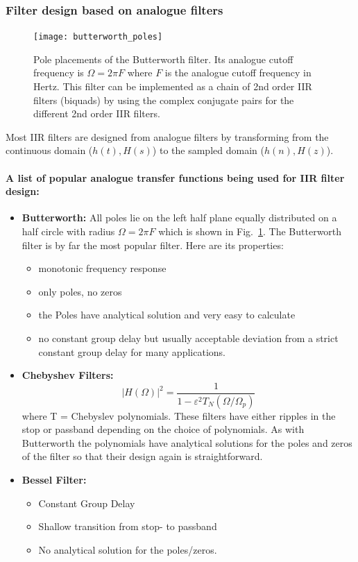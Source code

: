 \documentclass[12pt,a4paper]{article}
\begin{document}
\subsubsection{Filter design based on analogue filters}
\begin{figure}[!hbt]
\begin{center}
\mbox{\texttt{[image: butterworth\_poles]}}
\end{center}
\caption{Pole placements of the Butterworth filter. Its analogue
  cutoff frequency is $\Omega = 2\pi F$ where $F$ is the
  analogue cutoff frequency in Hertz. This filter can be implemented
  as a chain of 2nd order IIR filters (biquads) by using the
  complex conjugate pairs for the different 2nd order IIR filters.
\label{butterworth_poles}}
\end{figure}
Most IIR filters are designed from analogue filters by transforming
from the continuous domain ($h(t),H(s)$) to the sampled domain
($h(n),H(z)$).

\paragraph{A list of popular analogue transfer functions being
used for IIR filter design:}

\begin{itemize}
\item {\bf Butterworth:} All poles lie on the left half plane
  equally distributed on a half circle with radius $\Omega = 2\pi F$ which
  is shown in Fig.~\ref{butterworth_poles}. The Butterworth filter
  is by far the most popular filter. Here are its properties:
\begin{itemize} 
\item monotonic frequency response
\item only poles, no zeros
\item the Poles have analytical solution and very easy to calculate
\item no constant group delay but usually acceptable deviation from
  a strict constant group delay for many applications.
\end{itemize}

\item {\bf Chebyshev Filters:}
\begin{equation} 
|H(\Omega)|^{2} = \frac{1}{1 - \varepsilon^{2} T_{N} (\Omega/\Omega_{p})}
\end{equation}
where T = Chebyslev polynomials. These filters have either ripples
in the stop or passband depending on the choice of polynomials.
As with Butterworth the polynomials have analytical solutions for
the poles and zeros of the filter so that their design again is
straightforward.

\item {\bf Bessel Filter: }
\begin{itemize} 
\item Constant Group Delay
\item Shallow transition from stop- to passband
\item No analytical solution for the poles/zeros.
\end{itemize}
\end{itemize}
\end{document}
